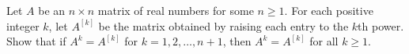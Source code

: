 Let $A$ be an $n \times n$ matrix of real numbers for some $n \geq 1$.
For each positive integer $k$, let $A^{[k]}$ be the matrix obtained by raising each entry to the $k$th
power. Show that if $A^k = A^{[k]}$ for $k=1,2,\dots,n+1$, then $A^k = A^{[k]}$ for all $k \geq 1$.
